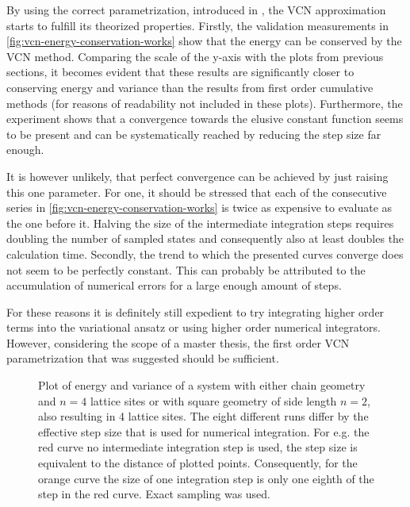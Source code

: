 By using the correct parametrization, introduced in , the VCN approximation starts to fulfill its theorized properties.
Firstly, the validation measurements in \autoref{fig:vcn-energy-conservation-works} show that the energy can be conserved by the VCN method.
Comparing the scale of the y-axis with the plots from previous sections, it becomes evident that these results are significantly closer to conserving energy and variance than the results from first order cumulative methods (for reasons of readability not included in these plots).
Furthermore, the experiment shows that a convergence towards the elusive constant function seems to be present and can be systematically reached by reducing the step size far enough.

It is however unlikely, that perfect convergence can be achieved by just raising this one parameter.
For one, it should be stressed that each of the consecutive series in \autoref{fig:vcn-energy-conservation-works} is twice as expensive to evaluate as the one before it.
Halving the size of the intermediate integration steps requires doubling the number of sampled states and consequently also at least doubles the calculation time.
Secondly, the trend to which the presented curves converge does not seem to be perfectly constant.
This can probably be attributed to the accumulation of numerical errors for a large enough amount of steps.

For these reasons it is definitely still expedient to try integrating higher order terms into the variational ansatz or using higher order numerical integrators.
However, considering the scope of a master thesis, the first order VCN parametrization that was suggested should be sufficient.


\begin{figure}[htbp]
    \centering
    \vspace{-0.5cm}
    \caption{
            Plot of energy and variance of a system with either chain geometry and $n=4$ lattice sites or with square geometry of side length $n=2$, also resulting in 4 lattice sites.
            The eight different runs differ by the effective step size that is used for numerical integration.
            For e.g. the red curve no intermediate integration step is used, the step size is equivalent to the distance of plotted points.
            Consequently, for the orange curve the size of one integration step is only one eighth of the step in the red curve.
            Exact sampling was used.
        }
    \label{fig:vcn-energy-conservation-works}
\end{figure}

